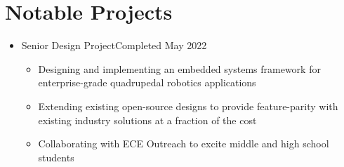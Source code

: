 \documentclass[10pt,letterpaper,sans]{moderncv}
\renewcommand{\_}{\textscale{.7}{\textunderscore}}
\newcommand{\Rplus}{\protect\hspace{-.1em}\protect\raisebox{.35ex}{\smaller{\smaller\textbf{+}}}}
\newcommand{\Cpp}{\mbox{C\Rplus\Rplus}\xspace}
\newcommand{\+}{%
  \raisebox{\dimexpr(\fontcharht\font`X-\height+\depth)/2\relax}{+}%
}
\begin{document}
\section{Notable Projects}
\begin{itemize}
  \iftoggle{pouchet}{
  \item{\cventry{Department of Computer Science}{Colorado State University -- Under Dr. Louis-Noël Pouchet}
    {Research on Practical Program Equivalence}{Completed May 2022}{}{
      \begin{itemize}
      \item Implementing a full-custom C compiler for data-specific targets, early efforts on language-agnostic analysis
      \item Investigating topics in symbolic evaluation, high performance computing, and sparse computation
      \item Sponsored by Intel and US Department of Energy, partnering with the NSF and Center for Domain-Specific Computing
      \end{itemize}
  }}}{}
  \iftoggle{yashwant}{
  \item{\cventry{Department of Computer Science}{Colorado State University -- Under Dr. Yashwant Malaiya}
    {Practical Program Equivalence Project}{Completed May 2022}{}{
      \begin{itemize}
      \item Wrote a tool to prove program equivalence across software versions via LLVM symbolic execution
      \item Achieved non-trivial equivalence analysis on Rust and \Cpp code, with graphical commentary on divergence
      \item Implemented using Rust; symbolic computations solved with Haybale and Boolector
      \end{itemize}
  }}}{}
\item{
  {Senior Design Project}{Completed May 2022}{}{
    \begin{itemize}
    \item Designing and implementing an embedded systems framework for enterprise-grade
      quadrupedal robotics applications
    \item Extending existing open-source designs to provide feature-parity with existing
      industry solutions at a fraction of the cost
    \item Collaborating with ECE Outreach to excite middle and high school students

\end{itemize}}}
\end{itemize}
\end{document}
